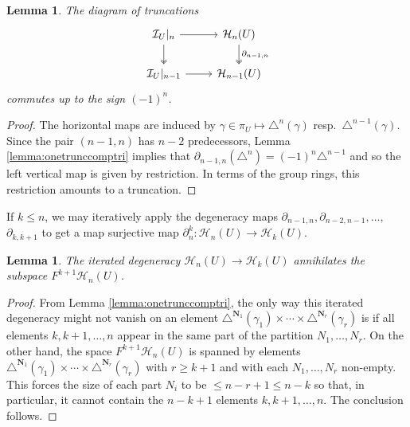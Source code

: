 \documentclass[12pt,letterpaper]{amsart}
\numberwithin{equation}{section}
\def\Nbold{{\mathbf N}}
\def\g{\gamma}
\def\tri{\triangle}
\newcommand{\p}{\partial}
\def\Hcal{{\mathcal H}}
\def\Ical{{\mathcal I}}
\newtheorem{lemma}[theorem]{Lemma}
\theoremstyle{remark}
\begin{document}
\begin{lemma}\label{lemma:truncation}
The diagram of truncations
\begin{equation}\label{eq:truncations}
    \begin{tikzcd}
    \Ical_{U}|_{n}\dar[two heads]\rar & \Hcal_{n}(U)\arrow[d, two heads, "\p_{n-1,n}"]\\
    \Ical_{U}|_{n-1}\rar & \Hcal_{n-1}(U)
\end{tikzcd}
\end{equation}
commutes up to the sign $(-1)^{{n}}$.
\end{lemma}
\begin{proof}
The horizontal maps are induced by $\g\in \pi_U\mapsto \tri^n(\g)$ resp.\ $\tri^{n-1}(\g)$. 
Since the pair $(n-1,n)$ has $n-2$ predecessors, Lemma \ref{lemma:onetrunccomptri}  implies that  $\p_{n-1,n}(\tri^n)=(-1)^n \tri^{n-1}$ and so the left vertical map is given by restriction.
In terms of the group rings, this  restriction amounts to a truncation.
\end{proof}

If $k\le n$, we may iteratively apply the degeneracy maps $\partial_{n-1,n}, \partial_{n-2,n-1}, \ldots,$ $\partial_{k,k+1}$ to get a map surjective map $\partial^k_n:\Hcal_n(U)\to \Hcal_k(U)$. 
\begin{lemma}\label{lem:iterateddegeneracy}
    The iterated degeneracy $\Hcal_n(U)\to \Hcal_k(U)$
    annihilates the subspace $F^{k+1}\Hcal_n(U)$.
\end{lemma}
\begin{proof}
    From Lemma \ref{lemma:onetrunccomptri}, the only way this iterated degeneracy might not vanish on an element 
    $\tri^{\Nbold_1}(\g_1)\times \cdots\times \tri^{\Nbold_r}(\g_r)$ is if all elements $k,k+1, \ldots, n$ appear in the same part of the partition $N_1,\ldots, N_r$. On the other hand, the space $F^{k+1}\Hcal_n(U)$ is spanned by elements $\tri^{\Nbold_1}(\g_1)\times \cdots\times \tri^{\Nbold_r}(\g_r)$ with $r\ge k+1$ and with each $N_1,\ldots, N_r$ non-empty. This forces the size of each part $N_i$ to be $\le n-r+1\le n-k$ so that, in particular, it cannot contain the $n-k+1$ elements $k,k+1, \ldots, n$. The conclusion follows.
\end{proof}
\end{document}
